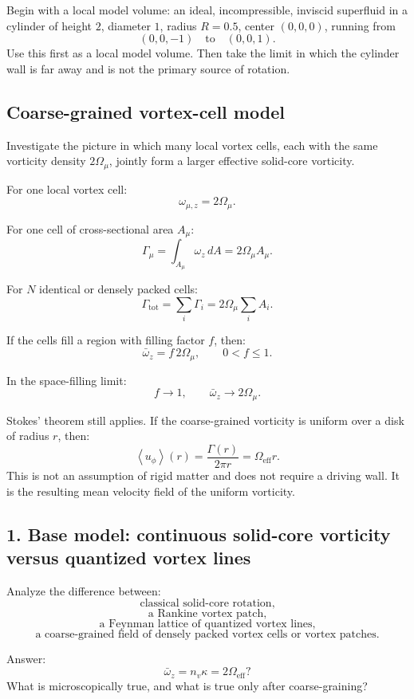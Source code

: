 \documentclass[11pt,a4paper]{article}
\begin{document}
Begin with a local model volume: an ideal, incompressible, inviscid superfluid in a cylinder of height \(2\), diameter \(1\), radius \(R=0.5\), center \((0,0,0)\), running from
\[
(0,0,-1)
\quad\text{to}\quad
(0,0,1).
\]
Use this first as a local model volume. Then take the limit in which the cylinder wall is far away and is not the primary source of rotation.

\subsection{Coarse-grained vortex-cell model}

Investigate the picture in which many local vortex cells, each with the same vorticity density \(2\Omega_{\mu}\), jointly form a larger effective solid-core vorticity.

For one local vortex cell:
\[
\omega_{\mu,z}=2\Omega_{\mu}.
\]

For one cell of cross-sectional area \(A_{\mu}\):
\[
\Gamma_{\mu}
=
\int_{A_{\mu}}\omega_z\,dA
=
2\Omega_{\mu}A_{\mu}.
\]

For \(N\) identical or densely packed cells:
\[
\Gamma_{\mathrm{tot}}
=
\sum_i\Gamma_i
=
2\Omega_{\mu}\sum_i A_i.
\]

If the cells fill a region with filling factor \(f\), then:
\[
\bar{\omega}_z
=
f\,2\Omega_{\mu},
\qquad
0<f\leq1.
\]

In the space-filling limit:
\[
f\rightarrow1,
\qquad
\bar{\omega}_z\rightarrow2\Omega_{\mu}.
\]

Stokes' theorem still applies. If the coarse-grained vorticity is uniform over a disk of radius \(r\), then:
\[
\left\langle u_{\phi}\right\rangle(r)
=
\frac{\Gamma(r)}{2\pi r}
=
\Omega_{\mathrm{eff}}r.
\]
This is not an assumption of rigid matter and does not require a driving wall. It is the resulting mean velocity field of the uniform vorticity.

\subsection{1. Base model: continuous solid-core vorticity versus quantized vortex lines}

Analyze the difference between:
\[
\text{classical solid-core rotation,}
\]
\[
\text{a Rankine vortex patch,}
\]
\[
\text{a Feynman lattice of quantized vortex lines,}
\]
\[
\text{a coarse-grained field of densely packed vortex cells or vortex patches.}
\]

Answer:
\[
\bar{\omega}_z
=
n_v\kappa
=
2\Omega_{\mathrm{eff}}?
\]
What is microscopically true, and what is true only after coarse-graining?
\end{document}
